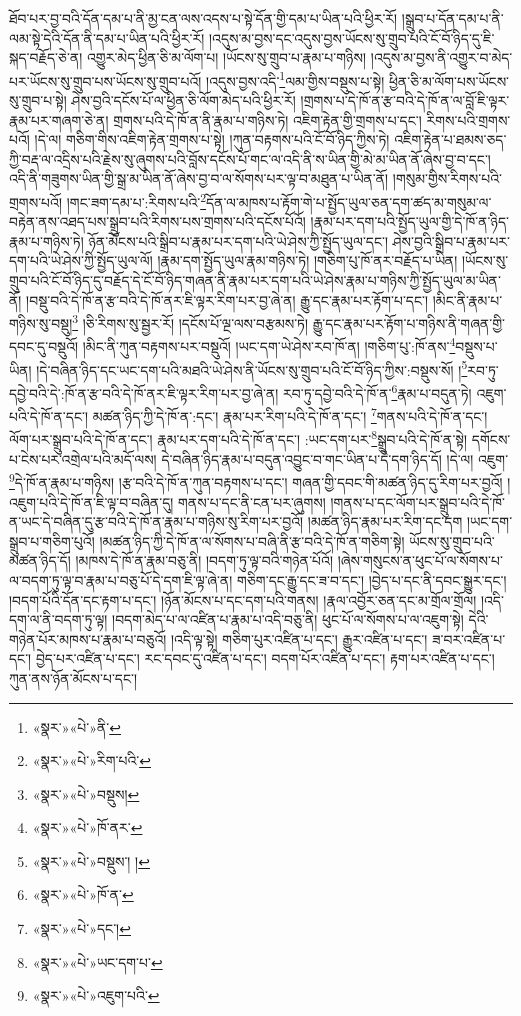 ཐོབ་པར་བྱ་བའི་དོན་དམ་པ་ནི་མྱ་ངན་ལས་འདས་པ་སྟེ་དོན་གྱི་དམ་པ་ཡིན་པའི་ཕྱིར་རོ། །སྒྲུབ་པ་དོན་དམ་པ་ནི་ལམ་སྟེ་དེའི་དོན་ནི་དམ་པ་ཡིན་པའི་ཕྱིར་རོ། །འདུས་མ་བྱས་དང་འདུས་བྱས་ཡོངས་སུ་གྲུབ་པའི་ངོ་བོ་ཉིད་དུ་ཇི་སྐད་བརྗོད་ཅེ་ན། འགྱུར་མེད་ཕྱིན་ཅི་མ་ལོག་པ། །ཡོངས་སུ་གྲུབ་པ་རྣམ་པ་གཉིས། །འདུས་མ་བྱས་ནི་འགྱུར་བ་མེད་པར་ཡོངས་སུ་གྲུབ་པས་ཡོངས་སུ་གྲུབ་པའོ། །འདུས་བྱས་འདི་\footnote{«སྣར་»«པེ་»ནི་}ལམ་གྱིས་བསྡུས་པ་སྟེ། ཕྱིན་ཅི་མ་ལོག་པས་ཡོངས་སུ་གྲུབ་པ་སྟེ། ཤེས་བྱའི་དངོས་པོ་ལ་ཕྱིན་ཅི་ལོག་མེད་པའི་ཕྱིར་རོ། །གྲགས་པ་དེ་ཁོ་ན་རྩ་བའི་དེ་ཁོ་ན་ལ་བློ་ཇི་ལྟར་རྣམ་པར་གཞག་ཅེ་ན། གྲགས་པའི་དེ་ཁོ་ན་ནི་རྣམ་པ་གཉིས་ཏེ། འཇིག་རྟེན་གྱི་གྲགས་པ་དང་། རིགས་པའི་གྲགས་པའོ། །དེ་ལ། གཅིག་གིས་འཇིག་རྟེན་གྲགས་པ་སྟེ། །ཀུན་བརྟགས་པའི་ངོ་བོ་ཉིད་ཀྱིས་ཏེ། འཇིག་རྟེན་པ་ཐམས་ཅད་ཀྱི་བརྡ་ལ་འདྲིས་པའི་རྗེས་སུ་ཞུགས་པའི་བློས་དངོས་པོ་གང་ལ་འདི་ནི་ས་ཡིན་གྱི་མེ་མ་ཡིན་ནོ་ཞེས་བྱ་བ་དང་། འདི་ནི་གཟུགས་ཡིན་གྱི་སྒྲ་མ་ཡིན་ནོ་ཞེས་བྱ་བ་ལ་སོགས་པར་ལྟ་བ་མཐུན་པ་ཡིན་ནོ། །གསུམ་གྱིས་རིགས་པའི་གྲགས་པའོ། །གང་ཟག་དམ་པ་:རིགས་པའི་\footnote{«སྣར་»«པེ་»རིག་པའི་}དོན་ལ་མཁས་པ་རྟོག་གེ་པ་སྤྱོད་ཡུལ་ཅན་དག་ཚད་མ་གསུམ་ལ་བརྟེན་ནས་འཐད་པས་སྒྲུབ་པའི་རིགས་པས་གྲགས་པའི་དངོས་པོའོ། །རྣམ་པར་དག་པའི་སྤྱོད་ཡུལ་གྱི་དེ་ཁོ་ན་ཉིད་རྣམ་པ་གཉིས་ཏེ། ཉོན་མོངས་པའི་སྒྲིབ་པ་རྣམ་པར་དག་པའི་ཡེ་ཤེས་ཀྱི་སྤྱོད་ཡུལ་དང་། ཤེས་བྱའི་སྒྲིབ་པ་རྣམ་པར་དག་པའི་ཡེ་ཤེས་ཀྱི་སྤྱོད་ཡུལ་ལོ། །རྣམ་དག་སྤྱོད་ཡུལ་རྣམ་གཉིས་ཏེ། །གཅིག་པུ་ཁོ་ནར་བརྗོད་པ་ཡིན། །ཡོངས་སུ་གྲུབ་པའི་ངོ་བོ་ཉིད་དུ་བརྗོད་དེ་ངོ་བོ་ཉིད་གཞན་ནི་རྣམ་པར་དག་པའི་ཡེ་ཤེས་རྣམ་པ་གཉིས་ཀྱི་སྤྱོད་ཡུལ་མ་ཡིན་ནོ། །བསྡུ་བའི་དེ་ཁོ་ན་རྩ་བའི་དེ་ཁོ་ནར་ཇི་ལྟར་རིག་པར་བྱ་ཞེ་ན། རྒྱུ་དང་རྣམ་པར་རྟོག་པ་དང་། །མིང་ནི་རྣམ་པ་གཉིས་སུ་བསྡུ།\footnote{«སྣར་»«པེ་»བསྡུས།} །ཅི་རིགས་སུ་སྦྱར་རོ། །དངོས་པོ་ལྔ་ལས་བརྩམས་ཏེ། རྒྱུ་དང་རྣམ་པར་རྟོག་པ་གཉིས་ནི་གཞན་གྱི་དབང་དུ་བསྡུའོ། །མིང་ནི་ཀུན་བརྟགས་པར་བསྡུའོ། །ཡང་དག་ཡེ་ཤེས་རབ་ཁོ་ན། །གཅིག་པུ་:ཁོ་ནས་\footnote{«སྣར་»«པེ་»ཁོ་ནར་}བསྡུས་པ་ཡིན། །དེ་བཞིན་ཉིད་དང་ཡང་དག་པའི་མཐའི་ཡེ་ཤེས་ནི་ཡོངས་སུ་གྲུབ་པའི་ངོ་བོ་ཉིད་ཀྱིས་:བསྡུས་སོ། །\footnote{«སྣར་»«པེ་»བསྡུས་། ། }རབ་ཏུ་དབྱེ་བའི་དེ་:ཁོ་ན་རྩ་བའི་དེ་ཁོ་ནར་ཇི་ལྟར་རིག་པར་བྱ་ཞེ་ན། རབ་ཏུ་དབྱེ་བའི་དེ་ཁོ་ན་\footnote{«སྣར་»«པེ་»ཁོ་ན་}རྣམ་པ་བདུན་ཏེ། འཇུག་པའི་དེ་ཁོ་ན་དང་། མཚན་ཉིད་ཀྱི་དེ་ཁོ་ན་:དང་། རྣམ་པར་རིག་པའི་དེ་ཁོ་ན་དང་། \footnote{«སྣར་»«པེ་»དང་།  }གནས་པའི་དེ་ཁོ་ན་དང་། ལོག་པར་སྒྲུབ་པའི་དེ་ཁོ་ན་དང་། རྣམ་པར་དག་པའི་དེ་ཁོ་ན་དང་། :ཡང་དག་པར་\footnote{«སྣར་»«པེ་»ཡང་དག་པ་}སྒྲུབ་པའི་དེ་ཁོ་ན་སྟེ། དགོངས་པ་ངེས་པར་འགྲེལ་པའི་མདོ་ལས། དེ་བཞིན་ཉིད་རྣམ་པ་བདུན་འབྱུང་བ་གང་ཡིན་པ་དེ་དག་ཉིད་དོ། །དེ་ལ། འཇུག་\footnote{«སྣར་»«པེ་»འཇུག་པའི་}དེ་ཁོ་ན་རྣམ་པ་གཉིས། །རྩ་བའི་དེ་ཁོ་ན་ཀུན་བརྟགས་པ་དང་། གཞན་གྱི་དབང་གི་མཚན་ཉིད་དུ་རིག་པར་བྱའོ། །འཇུག་པའི་དེ་ཁོ་ན་ཇི་ལྟ་བ་བཞིན་དུ། གནས་པ་དང་ནི་ངན་པར་ཞུགས། །གནས་པ་དང་ལོག་པར་སྒྲུབ་པའི་དེ་ཁོ་ན་ཡང་དེ་བཞིན་དུ་རྩ་བའི་དེ་ཁོ་ན་རྣམ་པ་གཉིས་སུ་རིག་པར་བྱའོ། །མཚན་ཉིད་རྣམ་པར་རིག་དང་དག །ཡང་དག་སྒྲུབ་པ་གཅིག་པུའོ། །མཚན་ཉིད་ཀྱི་དེ་ཁོ་ན་ལ་སོགས་པ་བཞི་ནི་རྩ་བའི་དེ་ཁོ་ན་གཅིག་སྟེ། ཡོངས་སུ་གྲུབ་པའི་མཚན་ཉིད་དོ། །མཁས་དེ་ཁོ་ན་རྣམ་བཅུ་ནི། །བདག་ཏུ་ལྟ་བའི་གཉེན་པོའོ། །ཞེས་གསུངས་ན་ཕུང་པོ་ལ་སོགས་པ་ལ་བདག་ཏུ་ལྟ་བ་རྣམ་པ་བཅུ་པོ་དེ་དག་ཇི་ལྟ་ཞེ་ན། གཅིག་དང་རྒྱུ་དང་ཟ་བ་དང་། །བྱེད་པ་དང་ནི་དབང་སྒྱུར་དང་། །བདག་པོའི་དོན་དང་རྟག་པ་དང་། །ཉོན་མོངས་པ་དང་དག་པའི་གནས། །རྣལ་འབྱོར་ཅན་དང་མ་གྲོལ་གྲོལ། །འདི་དག་ལ་ནི་བདག་ཏུ་ལྟ། །བདག་མེད་པ་ལ་འཛིན་པ་རྣམ་པ་འདི་བཅུ་ནི། ཕུང་པོ་ལ་སོགས་པ་ལ་འཇུག་སྟེ། དེའི་གཉེན་པོར་མཁས་པ་རྣམ་པ་བཅུའོ། །འདི་ལྟ་སྟེ། གཅིག་པུར་འཛིན་པ་དང་། རྒྱུར་འཛིན་པ་དང་། ཟ་བར་འཛིན་པ་དང་། བྱེད་པར་འཛིན་པ་དང་། རང་དབང་དུ་འཛིན་པ་དང་། བདག་པོར་འཛིན་པ་དང་། རྟག་པར་འཛིན་པ་དང་། ཀུན་ནས་ཉོན་མོངས་པ་དང་། 